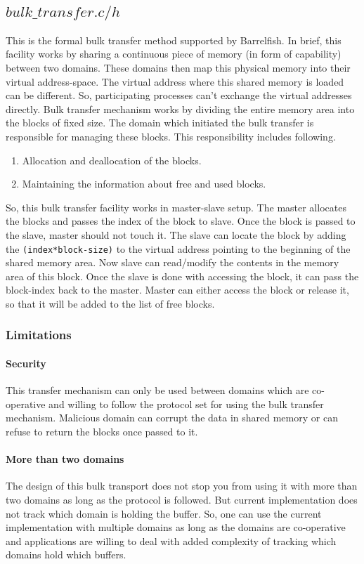 \documentclass[a4paper,twoside]{report} %
\begin{document}
\subsection{$bulk\_transfer.c/h$}
This is the formal bulk transfer method supported by Barrelfish.  In brief, this 
facility works by sharing a continuous piece of memory (in form of capability) 
between two domains.  These domains then map this physical memory into their 
virtual address-space.  The virtual address where this shared memory is loaded
can be different.  So, participating processes can't exchange the virtual 
addresses directly.  Bulk transfer mechanism works by dividing the entire 
memory area into the blocks of fixed size.  The domain which initiated the 
bulk transfer is responsible for managing these blocks.  This responsibility
includes following.
\begin{enumerate}
  \item Allocation and deallocation of the blocks.
  \item Maintaining the information about free and used blocks.
\end{enumerate}
So, this bulk transfer facility works in master-slave setup.  The master
allocates the blocks and passes the index of the block to slave.  
Once the block is passed to the slave, master should not touch it.  
The slave can locate the block by adding the \texttt{(index*block-size)} to the
virtual address pointing to the beginning of the shared memory area.
Now slave can read/modify the contents in the memory area of this block.  Once
the slave is done with accessing the block, it can pass the block-index
back to the master.  Master can either access the block or release it,
so that it will be added to the list of free blocks.

\subsubsection{Limitations}
\paragraph{Security}
This transfer mechanism can only be used between domains which are
co-operative and willing to follow the protocol set for using the bulk
transfer mechanism.  Malicious domain can corrupt the data in shared memory
or can refuse to return the blocks once passed to it.

\paragraph{More than two domains}
The design of this bulk transport does not stop you from using it with
more than two domains as long as the protocol is followed.  But current
implementation does not track which domain is holding the buffer. So,
one can use the current implementation with multiple domains as long
as the domains are co-operative and applications are willing to deal
with added complexity of tracking which domains hold which buffers.
\end{document}
